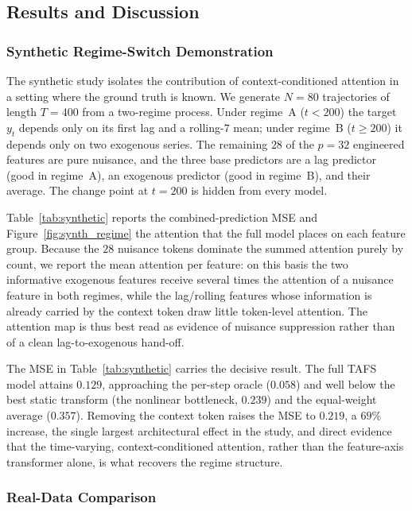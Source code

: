 \documentclass[journal]{IEEEtran}
\begin{document}
\subsection{Results and Discussion}
\label{sec:results}

\subsubsection{Synthetic Regime-Switch Demonstration}

The synthetic study isolates the contribution of context-conditioned attention in a setting where the ground truth is known. We generate $N{=}80$ trajectories of length $T{=}400$ from a two-regime process. Under regime~A ($t<200$) the target $y_t$ depends only on its first lag and a rolling-$7$ mean; under regime~B ($t\ge200$) it depends only on two exogenous series. The remaining $28$ of the $p{=}32$ engineered features are pure nuisance, and the three base predictors are a lag predictor (good in regime~A), an exogenous predictor (good in regime~B), and their average. The change point at $t{=}200$ is hidden from every model.




Table~\ref{tab:synthetic} reports the combined-prediction MSE and Figure~\ref{fig:synth_regime} the attention that the full model places on each feature group. Because the $28$ nuisance tokens dominate the summed attention purely by count, we report the mean attention per feature: on this basis the two informative exogenous features receive several times the attention of a nuisance feature in both regimes, while the lag/rolling features whose information is already carried by the context token draw little token-level attention. The attention map is thus best read as evidence of nuisance suppression rather than of a clean lag-to-exogenous hand-off.

The MSE in Table~\ref{tab:synthetic} carries the decisive result. The full TAFS model attains $0.129$, approaching the per-step oracle ($0.058$) and well below the best static transform (the nonlinear bottleneck, $0.239$) and the equal-weight average ($0.357$). Removing the context token raises the MSE to $0.219$, a $69\%$ increase, the single largest architectural effect in the study, and direct evidence that the time-varying, context-conditioned attention, rather than the feature-axis transformer alone, is what recovers the regime structure.

\subsubsection{Real-Data Comparison}
\end{document}
